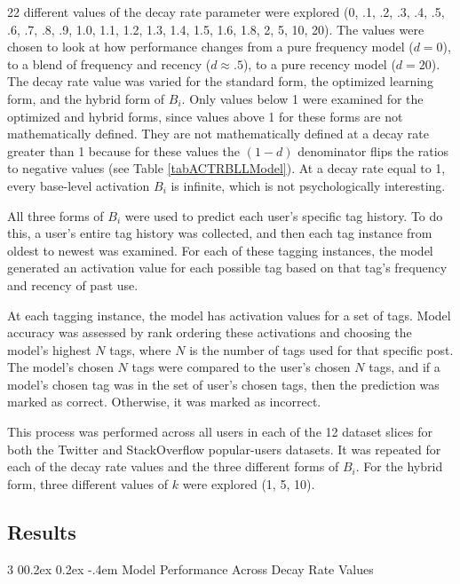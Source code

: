 \documentclass[man,floatsintext,donotrepeattitle]{apa6}
\makeatletter
\renewcommand{\subsubsection}{%
  \@startsection
  {subsubsection}%
  {3}%
  {\parindent}%
  {0\baselineskip \@plus 0.2ex \@minus 0.2ex}%
  {-.4em}%
  {\normalfont\normalsize\bfseries\addperi}}
\makeatother
\begin{document}
22 different values of the decay rate parameter were explored
(0, .1, .2, .3, .4, .5, .6, .7, .8, .9, 1.0, 1.1, 1.2, 1.3, 1.4, 1.5, 1.6, 1.8, 2, 5, 10, 20).
The values were chosen to look at how performance changes from a pure frequency model ($d=0$), to a blend of frequency and recency ($d \approx .5$), to a pure recency model ($d=20$).
The decay rate value was varied for the standard form, the optimized learning form, and the hybrid form of $B_{i}$. 
Only values below 1 were examined for the optimized and hybrid forms, since values above 1 for these forms are not mathematically defined. 
They are not mathematically defined at a decay rate greater than 1 because for these values the $(1-d)$ denominator flips the ratios to negative values (see Table \ref{tabACTRBLLModel}).
At a decay rate equal to 1, every base-level activation $B_{i}$ is infinite, which is not psychologically interesting.

All three forms of $B_{i}$ were used to predict each user's specific tag history.
To do this, a user's entire tag history was collected, and then each tag instance from oldest to newest was examined.
For each of these tagging instances, the model generated an activation value for each possible tag based on that tag's frequency and recency of past use. 

At each tagging instance, the model has activation values for a set of tags.
Model accuracy was assessed by rank ordering these activations and choosing the model's highest $N$ tags, where $N$ is the number of tags used for that specific post.
The model's chosen $N$ tags were compared to the user's chosen $N$ tags, and if a model's chosen tag was in the set of user's chosen tags, then the prediction was marked as correct.
Otherwise, it was marked as incorrect.

This process was performed across all users in each of the 12 dataset slices for both the Twitter and StackOverflow popular-users datasets.
It was repeated for each of the decay rate values and the three different forms of $B_{i}$.
For the hybrid form, three different values of $k$ were explored (1, 5, 10).

\subsection{Results}

\subsubsection{Model Performance Across Decay Rate Values}
\end{document}
